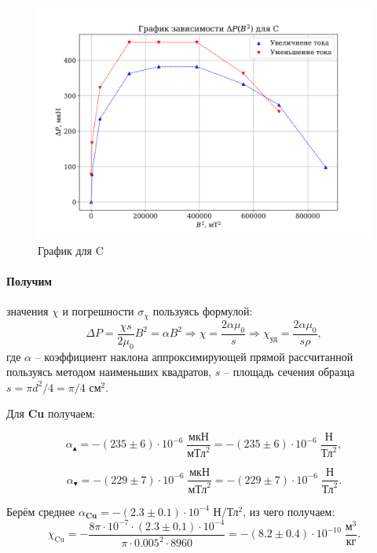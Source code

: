 \documentclass[a4paper,12pt]{article} %
\begin{document}
\begin{figure}
\begin{center}
\includegraphics[width=\linewidth]{plot_c.png}
\caption{График для C}
\label{plot_c}
\end{center}
\end{figure}

\paragraph{Получим} значения $\chi$ и погрешности $\sigma_\chi$ пользуясь формулой:
\[ \Delta P = \frac{\chi s}{2 \mu_0} B^2 = \alpha B^2 \Rightarrow \chi = \frac{2 \alpha \mu_0}{s} \Rightarrow \chi_\text{уд} = \frac{2 \alpha \mu_0}{s \rho} ,\]
где $\alpha$ -- коэффициент наклона аппроксимирующей прямой рассчитанной пользуясь методом наименьших квадратов, $s$ -- площадь сечения образца $s = \pi d^2 / 4 = \pi / 4$ см$^2$. 

Для \textbf{Cu} получаем:

\[ \alpha_\blacktriangle = -(235 \pm 6) \cdot 10^{-6} \; \frac{\text{мкН}}{\text{мТл}^2} =-(235 \pm 6) \cdot 10^{-6} \; \frac{\text{Н}}{\text{Тл}^2}, \]

\[ \alpha_\blacktriangledown = -(229 \pm 7) \cdot 10^{-6} \; \frac{\text{мкН}}{\text{мТл}^2} =-(229 \pm 7) \cdot 10^{-6} \; \frac{\text{Н}}{\text{Тл}^2}. \]

Берём среднее $\alpha_\textbf{Cu} = - (2.3 \pm 0.1) \cdot 10^{-4}$ Н/Тл$^2$, из чего получаем: 
\[\chi_\text{Cu} = - \frac{8 \pi \cdot 10^{-7} \cdot (2.3 \pm 0.1) \cdot 10^{-4}}{\pi \cdot 0.005^2 \cdot 8960} = - (8.2 \pm 0.4) \cdot 10^{-10} \;\frac{\text{м}^3}{\text{кг}}.\] 
\end{document}
